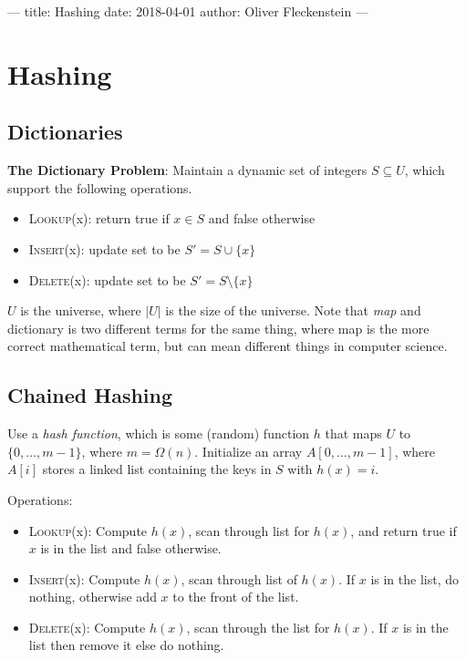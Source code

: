 ---
title: Hashing
date: 2018-04-01
author: Oliver Fleckenstein
---

\chapter{Hashing}

    \section{Dictionaries}
        \textbf{The Dictionary Problem}: Maintain a dynamic set of integers $S \subseteq U$, which support the following operations.

        \begin{itemize}
            \item \textsc{Lookup}(x): return true if $x \in S$ and false otherwise
            \item \textsc{Insert}(x): update set to be $S' = S \cup \{x\}$
            \item \textsc{Delete}(x): update set to be $S' = S \setminus \{x\}$
        \end{itemize}

        $U$ is the universe, where $|U|$ is the size of the universe.
        Note that \emph{map} and dictionary is two different terms for the same thing, where map is the more correct mathematical term, but can mean different things in computer science.

    \section{Chained Hashing}
        Use a \emph{hash function}, which is some (random) function $h$ that maps $U$ to $\{0, \ldots, m-1\}$, where $m = \Omega(n)$.
        Initialize an array $A[0, \ldots, m-1]$, where $A[i]$ stores a linked list containing the keys in $S$ with $h(x) = i$.

        Operations:
        \begin{itemize}
            \item \textsc{Lookup}(x): Compute $h(x)$, scan through list for $h(x)$, and return true if $x$ is in the list and false otherwise.
            \item \textsc{Insert}(x): Compute $h(x)$, scan through list of $h(x)$. If $x$ is in the list, do nothing, otherwise add $x$ to the front of the list.
            \item \textsc{Delete}(x): Compute $h(x)$, scan through the list for $h(x)$. If $x$ is in the list then remove it else do nothing.
        \end{itemize}

